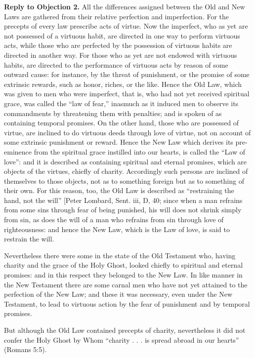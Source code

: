 \textbf{Reply to Objection 2.} All the differences assigned between the Old and New Laws are gathered from their relative perfection and imperfection. For the precepts of every law prescribe acts of virtue. Now the imperfect, who as yet are not possessed of a virtuous habit, are directed in one way to perform virtuous acts, while those who are perfected by the possession of virtuous habits are directed in another way. For those who as yet are not endowed with virtuous habits, are directed to the performance of virtuous acts by reason of some outward cause: for instance, by the threat of punishment, or the promise of some extrinsic rewards, such as honor, riches, or the like. Hence the Old Law, which was given to men who were imperfect, that is, who had not yet received spiritual grace, was called the ``law of fear,'' inasmuch as it induced men to observe its commandments by threatening them with penalties; and is spoken of as containing temporal promises. On the other hand, those who are possessed of virtue, are inclined to do virtuous deeds through love of virtue, not on account of some extrinsic punishment or reward. Hence the New Law which derives its pre-eminence from the spiritual grace instilled into our hearts, is called the ``Law of love'': and it is described as containing spiritual and eternal promises, which are objects of the virtues, chiefly of charity. Accordingly such persons are inclined of themselves to those objects, not as to something foreign but as to something of their own. For this reason, too, the Old Law is described as ``restraining the hand, not the will'' [Peter Lombard, Sent. iii, D, 40; since when a man refrains from some sins through fear of being punished, his will does not shrink simply from sin, as does the will of a man who refrains from sin through love of righteousness: and hence the New Law, which is the Law of love, is said to restrain the will.

Nevertheless there were some in the state of the Old Testament who, having charity and the grace of the Holy Ghost, looked chiefly to spiritual and eternal promises: and in this respect they belonged to the New Law. In like manner in the New Testament there are some carnal men who have not yet attained to the perfection of the New Law; and these it was necessary, even under the New Testament, to lead to virtuous action by the fear of punishment and by temporal promises.

But although the Old Law contained precepts of charity, nevertheless it did not confer the Holy Ghost by Whom ``charity . . . is spread abroad in our hearts'' (Romans 5:5).

